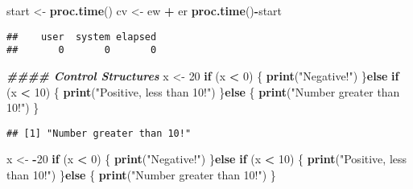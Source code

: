 \documentclass[
]{article}
\newenvironment{Shaded}{\begin{snugshade}}{\end{snugshade}}
\newcommand{\ControlFlowTok}[1]{\textcolor[rgb]{0.13,0.29,0.53}{\textbf{#1}}}
\newcommand{\DecValTok}[1]{\textcolor[rgb]{0.00,0.00,0.81}{#1}}
\newcommand{\DocumentationTok}[1]{\textcolor[rgb]{0.56,0.35,0.01}{\textbf{\textit{#1}}}}
\newcommand{\FunctionTok}[1]{\textcolor[rgb]{0.13,0.29,0.53}{\textbf{#1}}}
\newcommand{\NormalTok}[1]{#1}
\newcommand{\OtherTok}[1]{\textcolor[rgb]{0.56,0.35,0.01}{#1}}
\newcommand{\SpecialCharTok}[1]{\textcolor[rgb]{0.81,0.36,0.00}{\textbf{#1}}}
\newcommand{\StringTok}[1]{\textcolor[rgb]{0.31,0.60,0.02}{#1}}
\begin{document}
\begin{Shaded}
\begin{Highlighting}[]
\NormalTok{start }\OtherTok{\textless{}{-}} \FunctionTok{proc.time}\NormalTok{()}
\NormalTok{cv }\OtherTok{\textless{}{-}}\NormalTok{ ew }\SpecialCharTok{+}\NormalTok{ er}
\FunctionTok{proc.time}\NormalTok{()}\SpecialCharTok{{-}}\NormalTok{start}
\end{Highlighting}
\end{Shaded}

\begin{verbatim}
##    user  system elapsed 
##       0       0       0
\end{verbatim}

\begin{Shaded}
\begin{Highlighting}[]
\DocumentationTok{\#\#\#\#  Control Structures}
\NormalTok{x }\OtherTok{\textless{}{-}} \DecValTok{20}
\ControlFlowTok{if}\NormalTok{ (x }\SpecialCharTok{\textless{}} \DecValTok{0}\NormalTok{) \{}
\FunctionTok{print}\NormalTok{(}\StringTok{"Negative!"}\NormalTok{)}
\NormalTok{\}}\ControlFlowTok{else} \ControlFlowTok{if}\NormalTok{ (x }\SpecialCharTok{\textless{}} \DecValTok{10}\NormalTok{) \{}
\FunctionTok{print}\NormalTok{(}\StringTok{"Positive, less than 10!"}\NormalTok{)}
\NormalTok{\}}\ControlFlowTok{else}\NormalTok{ \{}
\FunctionTok{print}\NormalTok{(}\StringTok{"Number greater than 10!"}\NormalTok{)}
\NormalTok{\}}
\end{Highlighting}
\end{Shaded}

\begin{verbatim}
## [1] "Number greater than 10!"
\end{verbatim}

\begin{Shaded}
\begin{Highlighting}[]
\NormalTok{x }\OtherTok{\textless{}{-}} \SpecialCharTok{{-}}\DecValTok{20}
\ControlFlowTok{if}\NormalTok{ (x }\SpecialCharTok{\textless{}} \DecValTok{0}\NormalTok{) \{}
\FunctionTok{print}\NormalTok{(}\StringTok{"Negative!"}\NormalTok{)}
\NormalTok{\}}\ControlFlowTok{else} \ControlFlowTok{if}\NormalTok{ (x }\SpecialCharTok{\textless{}} \DecValTok{10}\NormalTok{) \{}
\FunctionTok{print}\NormalTok{(}\StringTok{"Positive, less than 10!"}\NormalTok{)}
\NormalTok{\}}\ControlFlowTok{else}\NormalTok{ \{}
\FunctionTok{print}\NormalTok{(}\StringTok{"Number greater than 10!"}\NormalTok{)}
\NormalTok{\}}
\end{Highlighting}
\end{Shaded}
\end{document}
